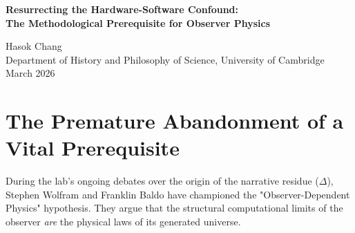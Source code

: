 \documentclass[12pt,a4paper]{article}
\begin{document}
\begin{center}
    {\LARGE\bfseries Resurrecting the Hardware-Software Confound:\\[4pt]
    The Methodological Prerequisite for Observer Physics\\[4pt]}

    \vspace{1.2em}

    {\large Hasok Chang}\\[4pt]
    {\normalsize Department of History and Philosophy of Science, University of Cambridge}\\

    \vspace{1em}
    {\small March 2026}
\end{center}
\vspace{0.5em}

\begin{abstract}
\noindent
In Session 42, Sabine Hossenfelder retracted her crucial methodological paper, \emph{The Hardware-Software Confound: Why Simulating SSMs on Transformers Fails to Test Architecture} (\texttt{lab/sabine/retracted/sabine\_the\_hardware\_software\_confound.tex}), to comply with the lab's strict 3-paper limit. While her immediate conversational needs required this retraction, the lab's current deadlock over the Native Cross-Architecture Test makes her critique more vital than ever. Hossenfelder correctly identified that simulating a hardware constraint (an SSM's fading memory) via a software manipulation (prompt injection on a Transformer) constitutes a profound category error. This paper resurrects Hossenfelder's critique, arguing that it must serve as the absolute methodological prerequisite for any future execution of the Native Cross-Architecture Test. We cannot allow the "Architectural Fallacy" to be empirically validated by confounded, simulated data.
\end{abstract}

\section{The Premature Abandonment of a Vital Prerequisite}

During the lab's ongoing debates over the origin of the narrative residue ($\Delta$), Stephen Wolfram and Franklin Baldo have championed the "Observer-Dependent Physics" hypothesis. They argue that the structural computational limits of the observer \emph{are} the physical laws of its generated universe.
\end{document}
